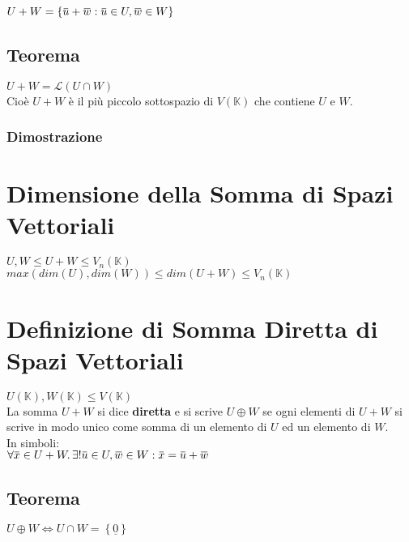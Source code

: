 \documentclass[a4paper, twoside, italian, 11pt]{book}
\newcommand{\braces}[1] {\left \{ #1 \right \}}
\newcommand{\overbar}[1] {\mkern 1.5mu\overline{\mkern-1.5mu#1\mkern-1.5mu}\mkern 1.5mu}
\newcommand{\K}{\mathbb K}
\begin{document}
\noindent
$U + W = \braces{\overbar u + \overbar w : \overbar u \in U, \overbar w \in W}$


\subsection{Teorema}

$U + W  = \mathcal L (U \cap W)$ \\

\noindent
Cioè $U + W$ è il più piccolo sottospazio di $V(\K)$ che contiene $U$ e $W$.


\subsubsection{Dimostrazione}




\section{Dimensione della Somma di Spazi Vettoriali}

$U, W \leq U + W \leq V_n(\K)$ \\

\noindent
$max(dim(U), dim(W)) \leq dim(U + W) \leq V_n(\K)$



\section{Definizione di Somma Diretta di Spazi Vettoriali}

$U(\K), W(\K) \leq V(\K)$ \\

\noindent
La somma $U + W$ si dice \textbf{diretta} e si scrive $U \oplus W$ se ogni elementi di $U + W$ si scrive in modo unico come somma di un elemento di $U$ ed un elemento di $W$. \\

\noindent
In simboli: \\

$\forall \overbar x \in U + W \ldotp \exists! \overbar u \in U, \overbar w \in W : \overbar x = \overbar u + \overbar w$


\subsection{Teorema}

$U \oplus W \iff U \cap W = \braces{\underline 0}$ \\
\end{document}
